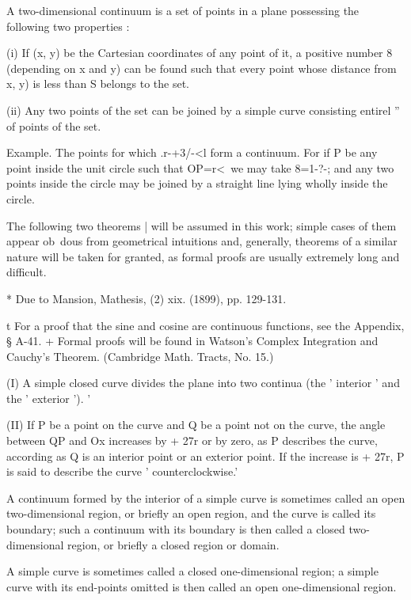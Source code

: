 A two-dimensional continuum is a set of points in a plane possessing
the following two properties :

(i) If (x, y) be the Cartesian coordinates of any point of it, a
positive number 8 (depending on x and y) can be found such that every
point whose distance from x, y) is less than S belongs to the set.

(ii) Any two points of the set can be joined by a simple curve
consisting entirel '' of points of the set.

Example. The points for which .r-+3/-<l form a continuum. For if P be
any point inside the unit circle such that OP=r<\, we may take 8=1-?-;
and any two points inside the circle may be joined by a straight line
lying wholly inside the circle.

The following two theorems | will be assumed in this work; simple
cases of them appear ob\ dous from geometrical intuitions and,
generally, theorems of a similar nature will be taken for granted, as
formal proofs are usually extremely long and difficult.

* Due to Mansion, Mathesis, (2) xix. (1899), pp. 129-131.

t For a proof that the sine and cosine are continuous functions, see
the Appendix, § A-41. + Formal proofs will be found in Watson's
Complex Integration and Cauchy's Theorem. (Cambridge Math. Tracts, No.
15.)

%
%

(I) A simple closed curve divides the plane into two continua (the '
interior ' and the ' exterior '). '

(II) If P be a point on the curve and Q be a point not on the curve,
the angle between QP and Ox increases by + 27r or by zero, as P
describes the curve, according as Q is an interior point or an
exterior point. If the increase is + 27r, P is said to describe the
curve ' counterclockwise.'

A continuum formed by the interior of a simple curve is sometimes
called an open two-dimensional region, or briefly an open region, and
the curve is called its boundary; such a continuum with its boundary
is then called a closed two-dimensional region, or briefly a closed
region or domain.

A simple curve is sometimes called a closed one-dimensional region; a
simple curve with its end-points omitted is then called an open
one-dimensional region.


